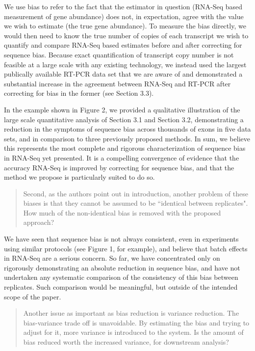 \documentclass{article}
\begin{document}
We use bias to refer to the fact that the estimator in question (RNA-Seq
based measurement of gene abundance) does not, in expectation, agree with the
value we wish to estimate (the true gene abundance). To measure the bias
directly, we would then need to know the true number of copies of each
transcript we wish to quantify and compare RNA-Seq based estimates before and
after correcting for sequence bias. Because exact quantification of transcript
copy number is not feasible at a large scale with any existing technology, we
instead used the largest publically available RT-PCR data set that we are aware
of and demonstrated a substantial increase in the agreement between RNA-Seq and
RT-PCR after correcting for bias in the former (see Section 3.3).

In the example shown in Figure 2, we provided a qualitative illustration of the
large scale quantitative analysis of Section 3.1 and Section 3.2, demonstrating
a reduction in the symptoms of sequence bias across thousands of exons in five
data sets, and in comparison to three previously proposed methods. In sum, we
believe this represents the most complete and rigorous characterization of
sequence bias in RNA-Seq yet presented. It is a compelling convergence of
evidence that the accuracy RNA-Seq is improved by correcting for sequence
bias, and that the method we propose is particularly suited to do so.


\begin{quote}
Second, as the authors point out in introduction, another problem of
these biases is that they cannot be assumed to be ``identical between
replicates". How much of the non-identical bias is removed with the
proposed approach?
\end{quote}

We have seen that sequence bias is not always consistent, even in experiments
using similar protocols (see Figure 1, for example), and believe that batch
effects in RNA-Seq are a serious concern. So far, we have concentrated only on
rigorously demonstrating an absolute reduction in sequence bias, and have not
undertaken any systematic comparison of the consistency of this bias between
replicates. Such comparison would be meaningful, but outside of the intended
scope of the paper.


\begin{quote}
Another issue as important as bias reduction is variance reduction. The
bias-variance trade off is unavoidable. By estimating the bias and trying to
adjust for it, more variance is introduced to the system. Is the amount of bias
reduced worth the increased variance, for downstream analysis?
\end{quote}
\end{document}

